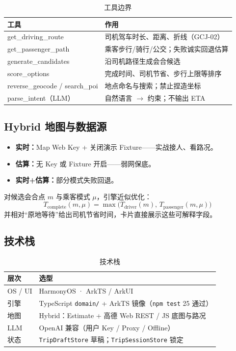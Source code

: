 \documentclass[UTF8,a4paper,zihao=-4]{ctexart}
\begin{document}
\begin{table}[H]
\centering
{}
\begin{tabularx}{\textwidth}{>{\ttfamily}p{3.3cm}X}
\toprule
\normalfont\bfseries 工具 & \bfseries 作用 \\
\midrule
get\_driving\_route & 司机驾车时长、距离、折线（GCJ-02） \\
get\_passenger\_path & 乘客步行/骑行/公交；失败诚实回退估算 \\
generate\_candidates & 沿司机路径生成会合候选 \\
score\_options & 完成时间、司机节省、步行上限等排序 \\
reverse\_geocode / search\_poi & 地点命名与搜索；禁止捏造坐标 \\
parse\_intent（LLM） & 自然语言 $\rightarrow$ 约束；不输出 ETA \\
\bottomrule
\end{tabularx}
\caption{工具边界}
\label{tab:tools}
\end{table}

\subsection{Hybrid 地图与数据源}

\begin{itemize}
  \item \textbf{实时：}Map Web Key + 关闭演示 Fixture——实战接人、看路况。
  \item \textbf{估算：}无 Key 或 Fixture 开启——弱网保底。
  \item \textbf{实时+估算：}部分模式失败回退。
\end{itemize}

对候选会合点 $m$ 与乘客模式 $\mu$，引擎近似优化：
\begin{equation*}
  T_{\mathrm{complete}}(m,\mu)=\max\bigl(T_{\mathrm{driver}}(m),\,T_{\mathrm{passenger}}(m,\mu)\bigr)
\end{equation*}
并相对“原地等待”给出司机节省时间，卡片直接展示这些可解释字段。

\subsection{技术栈}

\begin{table}[H]
\centering
{}
\begin{tabularx}{\textwidth}{p{3.0cm}X}
\toprule
\textbf{层次} & \textbf{选型} \\
\midrule
OS / UI & HarmonyOS · ArkTS / ArkUI \\
引擎 & TypeScript \texttt{domain/} + ArkTS 镜像（\texttt{npm test} 25 通过） \\
地图 & Hybrid：Estimate + 高德 Web REST / JS 底图与路况 \\
LLM & OpenAI 兼容（用户 Key / Proxy / Offline） \\
状态 & \texttt{TripDraftStore} 草稿；\texttt{TripSessionStore} 锁定 \\
\bottomrule
\end{tabularx}
\caption{技术栈}
\label{tab:stack}
\end{table}
\end{document}
